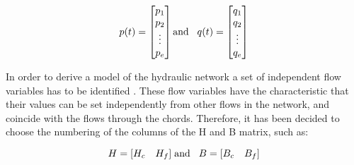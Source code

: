 
\begin{equation}
p(t) =
\begin{bmatrix}
         p_1 \\
	p_2 \\ 
	\vdots \\
	p_e \\
\end{bmatrix}
\text{and}\hspace{0.3cm}
q(t) =
\begin{bmatrix}
         q_1 \\
	q_2 \\ 
	\vdots \\
	q_e \\
\end{bmatrix}
\end{equation}
 
In order to derive a model of the hydraulic network a set of independent flow variables has to be identified \cite{TowerModel}. These flow variables have the characteristic 
that their values can be set independently from other flows in the network, and coincide with the flows through the chords. 
Therefore, it has been decided to choose the numbering of the columns of the 
H and B matrix, such as:



\begin{equation}
H = [H_c \quad H_f]
\hspace{0.1cm} \text{and}\hspace{0.3cm}
B = [B_c  \quad B_f]
\end{equation}

